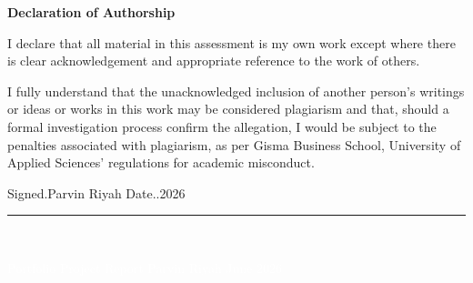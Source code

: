 \documentclass[12pt, a4paper]{report}
\begin{document}
\begin{titlepage}
\vspace{0.9cm}

\begin{center}
  {\fontsize{13}{17}\selectfont\bfseries\color{deepPurple}
    Declaration of Authorship}
\end{center}

\vspace{0.35cm}

\begin{center}
\begin{minipage}{0.88\textwidth}
\fontsize{12}{17}\selectfont\color{darkText}
\centering

I declare that all material in this assessment is my own work except where
there is clear acknowledgement and appropriate reference to the work of
others.

\vspace{10pt}

I fully understand that the unacknowledged inclusion of another person's
writings or ideas or works in this work may be considered plagiarism and
that, should a formal investigation process confirm the allegation, I would
be subject to the penalties associated with plagiarism, as per Gisma
Business School, University of Applied Sciences' regulations for academic
misconduct.

\vspace{20pt}

Signed.\enspace Parvin Riyah\enspace
Date..2026

\end{minipage}
\end{center}

\vfill
\noindent\textcolor{midPurple}{\rule{\linewidth}{1.5pt}}\\[-3pt]
\noindent\colorbox{deepPurple}{%
  \parbox[t][1.0cm]{\textwidth}{%
    \vspace{0.3cm}\centering
    \textcolor{white}{\small Portfolio Project Report \textbar{} Parvin Riyah \textbar{} June 2026}%
  }%
}

\end{titlepage}

\newpage
{}
\setcounter{page}{1}
\pagestyle{fancy}
\fancyhf{}
\renewcommand{\headrulewidth}{0.6pt}
\fancyhead[L]{\small\textit{\textcolor{midPurple}{B201 Computer Science Lab}}}
\fancyhead[R]{\small\textit{\textcolor{midPurple}{Portfolio Project Report}}}
\fancyfoot[C]{\small\thepage}
\end{document}
